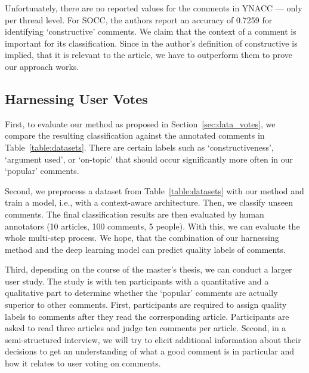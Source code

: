 Unfortunately, there are no reported values for the comments in YNACC –-- only per thread level. For SOCC, the authors \cite{kolhatkar2017constructive} report an accuracy of 0.7259 for identifying `constructive' comments. We claim that the context of a comment is important for its classification. Since in the author's definition of constructive is implied, that it is relevant to the article, we have to outperform them to prove our approach works.

\subsection{Harnessing User Votes}
First, to evaluate our method as proposed in Section~\ref{sec:data_votes}, we compare the resulting classification against the annotated comments in Table~\ref{table:datasets}. There are certain labels such as `constructiveness', `argument used', or `on-topic' that should occur significantly more often in our `popular' comments. 

Second, we preprocess a dataset from Table~\ref{table:datasets} with our method and train a model, i.e., with a context-aware architecture. Then, we classify unseen comments. The final classification results are then evaluated by human annotators (10 articles, 100 comments, 5 people). With this, we can evaluate the whole multi-step process. We hope, that the combination of our harnessing method and the deep learning model can predict quality labels of comments.

Third, depending on the course of the master's thesis, we can conduct a larger user study. The study is with ten participants with a quantitative and a qualitative part to determine whether the `popular' comments are actually superior to other comments. First, participants are required to assign quality labels to comments after they read the corresponding article. Participants are asked to read three articles and judge ten comments per article. Second, in a semi-structured interview, we will try to elicit additional information about their decisions to get an understanding of what a good comment is in particular and how it relates to user voting on comments. 